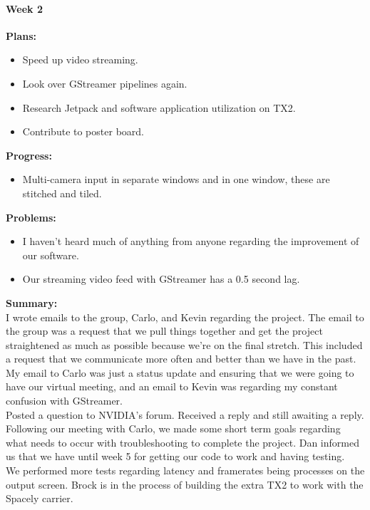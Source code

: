 \paragraph{Week 2}
\begin{adjustwidth}{2.5em}{0pt}
    \vspace{-0.5cm}\textbf{Plans:}
    \vspace{-0.5cm}
    \begin{itemize}
        \item Speed up video streaming.
		\item Look over GStreamer pipelines again.
		\item Research Jetpack and software application utilization on TX2.
		\item Contribute to poster board. 
    \end{itemize} 
    \vspace{-0.3cm}\textbf{Progress:}
    \vspace{-0.5cm}
    \begin{itemize}
        \item Multi-camera input in separate windows and in one window, these are stitched and tiled. 
    \end{itemize} 
    \vspace{-0.3cm}\textbf{Problems:}
    \vspace{-0.5cm}
    \begin{itemize}
        \item I haven't heard much of anything from anyone regarding the improvement of our software. 
		\item Our streaming video feed with GStreamer has a 0.5 second lag. 
    \end{itemize}  
    \vspace{-0.3cm}\noindent\textbf{Summary:}\\
    \noindent I wrote emails to the group, Carlo, and Kevin regarding the project. The email to the group was a request that we pull things together and get the project straightened as much as possible because we're on the final stretch. This included a request that we communicate more often and better than we have in the past. My email to Carlo was just a status update and ensuring that we were going to have our virtual meeting, and an email to Kevin was regarding my constant confusion with GStreamer. \\
			  Posted a question to NVIDIA's forum. Received a reply and still awaiting a reply. \\
			  Following our meeting with Carlo, we made some short term goals regarding what needs to occur with troubleshooting to complete the project. Dan informed us that we have until week 5 for getting our code to work and having testing. \\
			  We performed more tests regarding latency and framerates being processes on the output screen. Brock is in the process of building the extra TX2 to work with the Spacely carrier. \\
\end{adjustwidth} 

